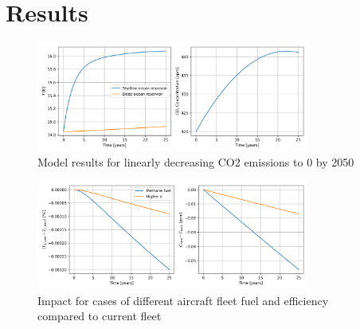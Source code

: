 \documentclass{article}
\begin{document}





\section{Results}

\begin{figure}[H]
    \centering
    \includegraphics[width=0.8\textwidth]{figures/model.png}
    \caption{Model results for linearly decreasing CO2 emissions to 0 by 2050}
    \label{fig:model}
\end{figure}

\begin{figure}[H]
    \centering
    \includegraphics[width=0.8\textwidth]{figures/case_comparison.png}
    \caption{Impact for cases of different aircraft fleet fuel and efficiency compared to current fleet}
    \label{fig:case_comparison}
\end{figure}
\end{document}
